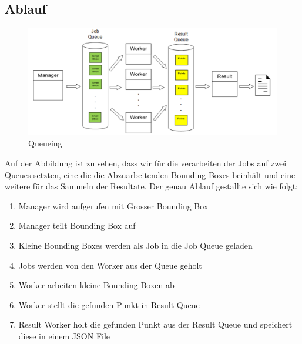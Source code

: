 \subsection{Ablauf}
\label{subsec:ablauf}
\begin{figure}[H]
\includegraphics[width=\textwidth]{images/queuing.png}
\caption[Queueing]{Queueing}
\end{figure}
Auf der Abbildung ist zu sehen, dass wir für die verarbeiten der Jobs auf zwei Queues setzten, eine die die Abzuarbeitenden Bounding Boxes beinhält und eine weitere für das Sammeln der Resultate. Der genau Ablauf gestallte sich wie folgt:
\begin{enumerate}
		\item Manager wird aufgerufen mit Grosser Bounding Box
		\item Manager teilt Bounding Box auf
		\item Kleine Bounding Boxes werden als Job in die Job Queue geladen
		\item Jobs werden von den Worker aus der Queue geholt
		\item Worker arbeiten kleine Bounding Boxen ab
		\item Worker stellt die gefunden Punkt in Result Queue
		\item Result Worker holt die gefunden Punkt aus der Result Queue und speichert diese in einem JSON File 
\end{enumerate}









